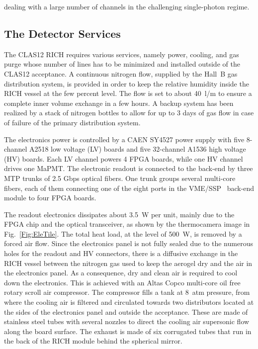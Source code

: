 \documentclass[5p,times,twocolumn]{elsarticle}
\begin{document}
\clearpage

\noindent
dealing with a large number of channels in the challenging single-photon regime.


\subsection{The Detector Services}

The CLAS12 RICH requires various services, namely power, cooling, and gas purge whose number of lines has to be
minimized and installed outside of the CLAS12 acceptance. A continuous nitrogen flow, supplied by the Hall~B gas
distribution system, is provided in order to keep the relative humidity inside the RICH vessel at the few percent
level. The flow is set to about 40~l/m to ensure a complete inner volume exchange in a few hours. 
A backup system has been realized by a stack of nitrogen bottles to allow for up to 3 days of gas flow in case of
failure of the primary distribution system.

The electronics power is controlled by a CAEN SY4527 power supply with five 8-channel A2518 low voltage (LV) boards and five
32-channel A1536 high voltage (HV) boards. Each LV channel powers 4 FPGA boards, while one HV channel drives one MaPMT. The
electronic readout is connected to the back-end by three MTP trunks of 2.5 Gbps optical fibers. One trunk groups
several multi-core fibers, each of them connecting one of the eight ports in the VME/SSP~\cite{daq-nim} back-end
module to four FPGA boards.

The readout electronics dissipates about 3.5~W per unit, mainly due to the FPGA chip and the optical transceiver, as
shown by the thermocamera image in Fig.~\ref{Fig:EleTile}. The total heat load, at the level of 500~W, is removed by
a forced air flow. Since the electronics panel is not fully sealed due to the numerous holes for the readout and HV
connectors, there is a diffusive exchange in the RICH vessel between the nitrogen gas used to keep the aerogel dry
and the air in the electronics panel. As a consequence, dry and clean air is required to cool down the electronics. This
is achieved with an Altas Copco multi-core oil free rotary scroll air compressor. The compressor fills a tank at 8~atm
pressure, from where the cooling air is filtered and circulated towards two distributors located at the sides of the
electronics panel and outside the acceptance. These are made of stainless steel tubes with several nozzles to direct
the cooling air supersonic flow along the board surface. The exhaust is made of six corrugated tubes that run in the
back of the RICH module behind the spherical mirror.
\end{document}
